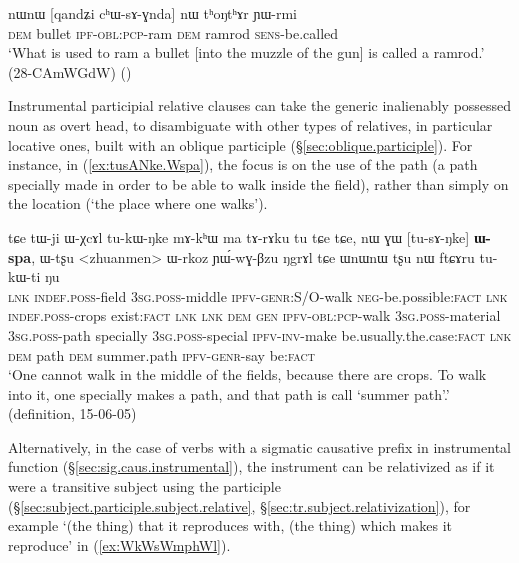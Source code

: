 \begin{exe}
\ex \label{ex:qandZi.chWsAGnda}
\gll nɯnɯ [qandʑi cʰɯ-sɤ-ɣnda] nɯ tʰoŋtʰɤr ɲɯ-rmi \\
\textsc{dem} bullet \textsc{ipf}-\textsc{obl}:\textsc{pcp}-ram \textsc{dem} ramrod \textsc{sens}-be.called \\
 \glt `What is used to ram a bullet [into the muzzle of the gun] is called a ramrod.' (28-CAmWGdW)
()
\end{exe} 
 
 Instrumental participial relative clauses can take the generic inalienably possessed noun  as overt head, to disambiguate with other types of relatives, in particular locative ones, built with an oblique participle (§\ref{sec:oblique.participle}). For instance, in (\ref{ex:tusANke.Wspa}), the focus is on the use of the path (a path specially made in order to be able to walk inside the field), rather than simply on the location (`the place where one walks').

\begin{exe}
\ex \label{ex:tusANke.Wspa}
\gll tɕe tɯ-ji ɯ-χcɤl tu-kɯ-ŋke mɤ-kʰɯ ma tɤ-rɤku tu tɕe tɕe, nɯ ɣɯ [tu-sɤ-ŋke] \textbf{ɯ-spa}, ɯ-tʂu <zhuanmen> ɯ-rkoz ɲɯ́-wɣ-βzu ŋgrɤl tɕe ɯnɯnɯ tʂu nɯ ftɕɤru tu-kɯ-ti ŋu \\
\textsc{lnk} \textsc{indef}.\textsc{poss}-field \textsc{3sg}.\textsc{poss}-middle \textsc{ipfv}-\textsc{genr}:S/O-walk \textsc{neg}-be.possible:\textsc{fact} \textsc{lnk} \textsc{indef}.\textsc{poss}-crops exist:\textsc{fact} \textsc{lnk} \textsc{lnk} \textsc{dem} \textsc{gen} \textsc{ipfv}-\textsc{obl}:\textsc{pcp}-walk \textsc{3sg}.\textsc{poss}-material \textsc{3sg}.\textsc{poss}-path specially \textsc{3sg}.\textsc{poss}-special \textsc{ipfv}-\textsc{inv}-make be.usually.the.case:\textsc{fact} \textsc{lnk} \textsc{dem} path \textsc{dem} summer.path \textsc{ipfv}-\textsc{genr}-say be:\textsc{fact} \\
\glt `One cannot walk in the middle of the fields, because there are crops. To walk into it, one specially makes a path, and that path is call `summer path'.' (definition, 15-06-05)
\end{exe} 

Alternatively, in the case of verbs with a sigmatic causative prefix in instrumental function (§\ref{sec:sig.caus.instrumental}), the instrument can be relativized as if it were a transitive subject using the  participle (§\ref{sec:subject.participle.subject.relative}, §\ref{sec:tr.subject.relativization}), for example  `(the thing) that it reproduces with, (the thing) which makes it reproduce' in (\ref{ex:WkWsWmphWl}).

